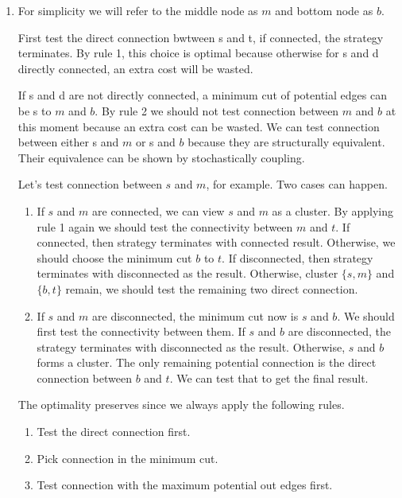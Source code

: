 \documentclass{oxmathproblems}
\begin{document}
\begin{enumerate}
  \item {
    For simplicity we will refer to the middle node as $m$ and bottom node as $b$.

    First test the direct connection bwtween s and t, if connected, the strategy terminates. By rule 1, this choice is optimal because otherwise for s and d directly connected, an extra cost will be wasted.

    If s and d are not directly connected, a minimum cut of potential edges can be s to $m$ and $b$. By rule 2 we should not test connection between $m$ and $b$ at this moment because an extra cost can be wasted. We can test connection between either s and $m$ or s and $b$ because they are structurally equivalent. Their equivalence can be shown by stochastically coupling.

    Let's test connection between $s$ and $m$, for example. Two cases can happen.

    \begin{enumerate}
      \item If $s$ and $m$ are connected, we can view $s$ and $m$ as a cluster. By applying rule 1 again we should test the connectivity between $m$ and $t$. If connected, then strategy terminates with connected result. Otherwise, we should choose the minimum cut $b$ to $t$. If disconnected, then strategy terminates with disconnected as the result. Otherwise, cluster $\{s,m\}$ and $\{b,t\}$ remain, we should test the remaining two direct connection.
      \item If $s$ and $m$ are disconnected, the minimum cut now is $s$ and $b$. We should first test the connectivity between them. If $s$ and $b$ are disconnected, the strategy terminates with disconnected as the result. Otherwise, $s$ and $b$ forms a cluster. The only remaining potential connection is the direct connection between $b$ and $t$. We can test that to get the final result.
    \end{enumerate}

    The optimality preserves since we always apply the following rules.
    \begin{enumerate}
      \item Test the direct connection first.
      \item Pick connection in the minimum cut.
      \item Test connection with the maximum potential out edges first.
    \end{enumerate}

}
\end{enumerate}
\end{document}
